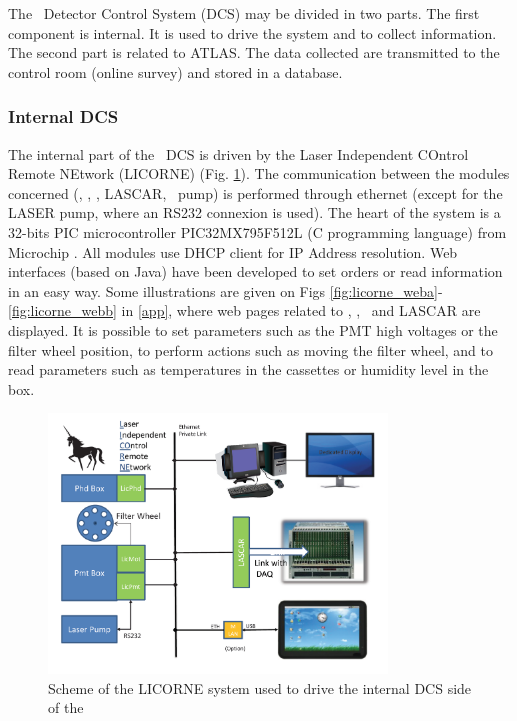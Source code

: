The \las~Detector Control System (DCS) may be divided in two parts. The first component is internal. It is used to drive the system and to collect information. The second part is related to ATLAS. The data collected are transmitted to the control room (online survey) and stored in a database.

\subsubsection{Internal DCS}

The internal part of the \las~DCS is driven by the Laser Independent COntrol Remote NEtwork (LICORNE) (Fig. \ref{fig:laslicorne}). The communication between the modules concerned (\licmot, \licphd, \licpmt, LASCAR, \laser~pump) is performed through ethernet (except for the LASER pump, where an RS232 connexion is used). The heart of the system is a 32-bits PIC microcontroller PIC32MX795F512L (C programming language) from Microchip \cite{ref:picmicro}. All modules use DHCP client for IP Address resolution. Web interfaces (based on Java) have been developed to set orders or read information in an easy way. Some illustrations are given on Figs \ref{fig:licorne_weba}-\ref{fig:licorne_webb} in \ref{app}, where web pages related to  \licmot, \licphd, \licpmt~and LASCAR are displayed. It is possible to set parameters such as the PMT high voltages or the filter wheel position, to perform actions such as moving the filter wheel, and to read parameters such as temperatures in the cassettes or humidity level in the \phocal box.


\begin{figure}[htbp]
\centering
\includegraphics[width=9cm]{figures/licorne.pdf}
\caption{Scheme of the LICORNE system used to drive the internal DCS side of the \las}\label{fig:laslicorne}
\end{figure}

